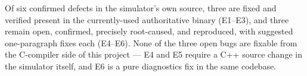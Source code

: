 \documentclass[11pt,a4paper]{report}
\begin{document}
Of six confirmed defects in the simulator's own source, three are fixed and verified
present in the currently-used authoritative binary (E1--E3), and three remain open,
confirmed, precisely root-caused, and reproduced, with suggested one-paragraph fixes
each (E4--E6). None of the three open bugs are fixable from the C-compiler side of this
project --- E4 and E5 require a C++ source change in the simulator itself, and E6 is a
pure diagnostics fix in the same codebase.
\end{document}
